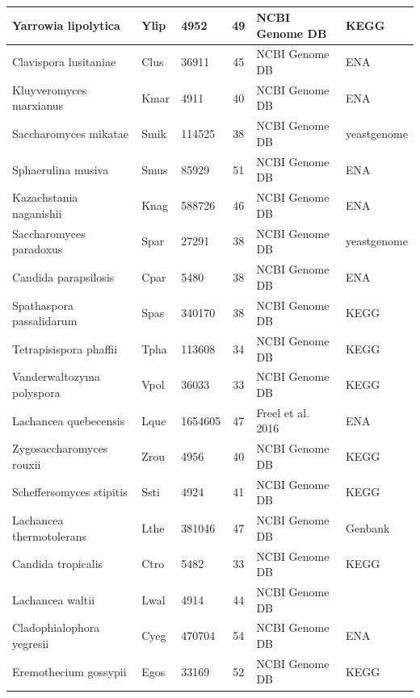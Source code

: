 \documentclass[letter,12pt]{article}
\begin{document}
\begin{table}
\begin{tabular}{ | l | l | l | c | l | l | }
	Yarrowia lipolytica 		& Ylip 		& 4952 			& 49 	& NCBI Genome DB 	& KEGG \\ \hline
	Clavispora lusitaniae 		& Clus 		& 36911 		& 45 	& NCBI Genome DB 	& ENA \\ \hline
	Kluyveromyces marxianus 	& Kmar 		& 4911 			& 40 	& NCBI Genome DB 	& ENA \\ \hline
	Saccharomyces mikatae 		& Smik 		& 114525 		& 38 	& NCBI Genome DB 	& yeastgenome \\ \hline
	Sphaerulina musiva 		& Smus 		& 85929 		& 51 	& NCBI Genome DB 	& ENA \\ \hline
	Kazachstania naganishii 	& Knag 		& 588726 		& 46 	& NCBI Genome DB 	& ENA \\ \hline
	Saccharomyces paradoxus 	& Spar 		& 27291 		& 38 	& NCBI Genome DB 	& yeastgenome \\ \hline
	Candida parapsilosis 		& Cpar 		& 5480 			& 38 	& NCBI Genome DB 	& ENA \\ \hline
	Spathaspora passalidarum 	& Spas 		& 340170 		& 38 	& NCBI Genome DB 	& KEGG \\ \hline
	Tetrapisispora phaffii 		& Tpha 		& 113608 		& 34 	& NCBI Genome DB 	& KEGG \\ \hline
	Vanderwaltozyma polyspora 	& Vpol 		& 36033 		& 33 	& NCBI Genome DB 	& KEGG \\ \hline
	Lachancea quebecensis 		& Lque 		& 1654605 		& 47 	& Freel et al. 2016 	& ENA \\ \hline
	Zygosaccharomyces rouxii 	& Zrou 		& 4956 			& 40 	& NCBI Genome DB 	& KEGG \\ \hline
	Scheffersomyces stipitis 	& Ssti 		& 4924 			& 41 	& NCBI Genome DB 	& KEGG \\ \hline
	Lachancea thermotolerans 	& Lthe 		& 381046 		& 47 	& NCBI Genome DB 	& Genbank \\ \hline
	Candida tropicalis 		& Ctro 		& 5482 			& 33 	& NCBI Genome DB 	& KEGG \\ \hline
	Lachancea waltii 		& Lwal 		& 4914 			& 44 	& NCBI Genome DB 	& \  \\ \hline
	Cladophialophora yegresii 	& Cyeg 		& 470704 		& 54 	& NCBI Genome DB 	& ENA \\ \hline
	Eremothecium gossypii 		& Egos 		& 33169 		& 52 	& NCBI Genome DB 	& KEGG \\ \hline
\end{tabular}
\caption{}
\label{tab:org_overview}
\end{table}
\end{document}
